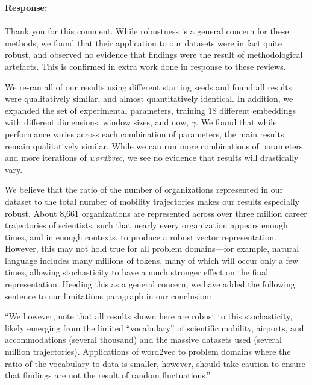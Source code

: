 \documentclass[12pt,a4paper]{article}
\newcommand{\response}[1]{{\noindent \textbf{Response:} \\ \\ \noindent #1}}
\begin{document}
\response{Thank you for this comment. While robustness is a general concern for these methods, we found that their application to our datasets were in fact quite robust, and observed no evidence that findings were the result of methodological artefacts. This is confirmed in extra work done in response to these reviews.

	We re-ran all of our results using different starting seeds and found all results were qualitatively similar, and almost quantitatively identical.
	In addition, we expanded the set of experimental parameters, training 18 different embeddings with different dimensions, window sizes, and now, $\gamma$.
	We found that while performance varies across each combination of parameters, the main results remain qualitatively similar.
	While we can run more combinations of parameters, and more iterations of \textit{word2vec}, we see no evidence that results will drastically vary.

	We believe that the ratio of the number of organizations represented in our dataset to the total number of mobility trajectories makes our results especially robust.
	About 8,661 organizations are represented across over three million career trajectories of scientists, such that nearly every organization appears enough times, and in enough contexts, to produce a robust vector representation.
	However, this may not hold true for all problem domains—for example, natural language includes many millions of tokens, many of which will occur only a few times, allowing stochasticity to have a much stronger effect on the final representation.
	Heeding this as a general concern, we have added the following sentence to our limitations paragraph in our conclusion:

	“We however, note that all results shown here are robust to this stochasticity, likely emerging from the limited ``vocabulary'' of scientific mobility, airports, and accommodations (several thousand) and the massive datasets used (several million trajectories). Applications of word2vec to problem domains where the ratio of the vocabulary to data is smaller, however, should take caution to ensure that findings are not the result of random fluctuations.”

}
\end{document}
